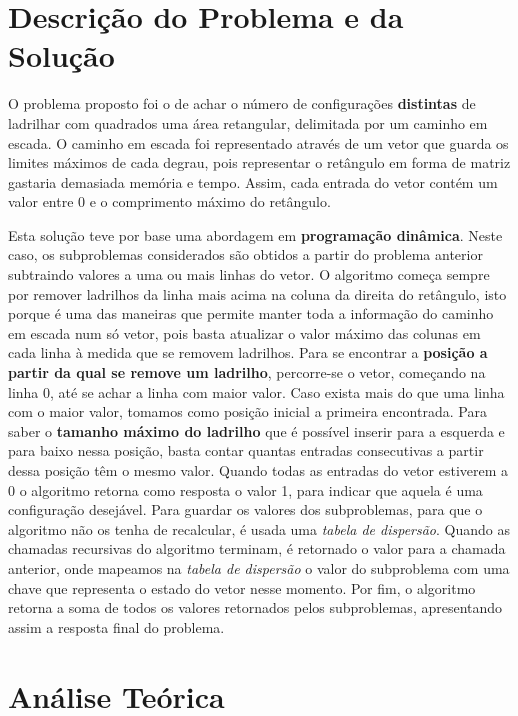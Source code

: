 \documentclass[12pt,a4paper]{article}
\begin{document}
  \section{Descrição do Problema e da Solução}

  O problema proposto foi o de achar o número de configurações \textbf{distintas} de ladrilhar com quadrados uma área retangular, delimitada por um caminho em escada.
  O caminho em escada foi representado através de um vetor que guarda os limites máximos de cada degrau, pois representar o retângulo em forma de matriz gastaria demasiada memória e tempo.
  Assim, cada entrada do vetor contém um valor entre 0 e o comprimento máximo do retângulo.

  Esta solução teve por base uma abordagem em \textbf{programação dinâmica}.
  Neste caso, os subproblemas considerados são obtidos a partir do problema anterior subtraindo valores a uma ou mais linhas do vetor.
  O algoritmo começa sempre por remover ladrilhos da linha mais acima na coluna da direita do retângulo, isto porque é uma das maneiras que permite manter toda a informação do caminho em escada num só vetor, pois basta atualizar o valor máximo das colunas em cada linha à medida que se removem ladrilhos.
  Para se encontrar a \textbf{posição a partir da qual se remove um ladrilho}, percorre-se o vetor, começando na linha 0, até se achar a linha com maior valor.
  Caso exista mais do que uma linha com o maior valor, tomamos como posição inicial a primeira encontrada.
  Para saber o \textbf{tamanho máximo do ladrilho} que é possível inserir para a esquerda e para baixo nessa posição, basta contar quantas entradas consecutivas a partir dessa posição têm o mesmo valor.
  Quando todas as entradas do vetor estiverem a 0 o algoritmo retorna como resposta o valor 1, para indicar que aquela é uma configuração desejável.
  Para guardar os valores dos subproblemas, para que o algoritmo não os tenha de recalcular, é usada uma \textit{tabela de dispersão}.
  Quando as chamadas recursivas do algoritmo terminam, é retornado o valor para a chamada anterior, onde mapeamos na \textit{tabela de dispersão} o valor do subproblema com uma chave que representa o estado do vetor nesse momento.
  Por fim, o algoritmo retorna a soma de todos os valores retornados pelos subproblemas, apresentando assim a resposta final do problema.

  \section{Análise Teórica}
\end{document}
